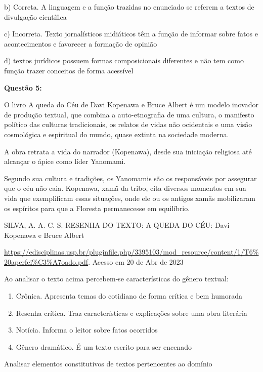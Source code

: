 b) Correta. A linguagem e a função trazidas no enunciado se referem a
textos de divulgação científica

c) Incorreta. Texto jornalísticos midiáticos têm a função de informar
sobre fatos e acontecimentos e favorecer a formação de opinião

d) textos jurídicos possuem formas composicionais diferentes e não tem
como função trazer conceitos de forma acessível

\textbf{Questão 5:}

O livro A queda do Céu de Davi Kopenawa e Bruce Albert é um modelo
inovador de produção textual, que combina a auto-etnografia de uma
cultura, o manifesto político das culturas tradicionais, os relatos de
vidas não ocidentais e uma visão cosmológica e espiritual do mundo,
quase extinta na sociedade moderna.

A obra retrata a vida do narrador (Kopenawa), desde sua iniciação
religiosa até alcançar o ápice como líder Yanomami.

Segundo sua cultura e tradições, os Yanomamis são os responsáveis por
assegurar que o céu não caia. Kopenawa, xamã da tribo, cita diversos
momentos em sua vida que exemplificam essas situações, onde ele ou os
antigos xamãs mobilizaram os espíritos para que a Floresta permanecesse
em equilíbrio.

SILVA, A. A. C. S. RESENHA DO TEXTO: A QUEDA DO CÉU: Davi Kopenawa e
Bruce Albert

\href{https://edisciplinas.usp.br/pluginfile.php/3395103/mod_resource/content/1/T6\%20aperfei\%C3\%A7oado.pdf}{{https://edisciplinas.usp.br/pluginfile.php/3395103/mod\_resource/content/1/T6\%20aperfei\%C3\%A7oado.pdf}}.
Acesso em 20 de Abr de 2023

Ao analisar o texto acima percebem-se características do gênero textual:

\begin{enumerate}
\def\labelenumi{\alph{enumi})}
\item
  Crônica. Apresenta temas do cotidiano de forma crítica e bem humorada
\item
  Resenha crítica. Traz características e explicações sobre uma obra
  literária
\item
  Notícia. Informa o leitor sobre fatos ocorridos
\item
  Gênero dramático. É um texto escrito para ser encenado
\end{enumerate}

Analisar elementos constitutivos de textos pertencentes ao domínio

